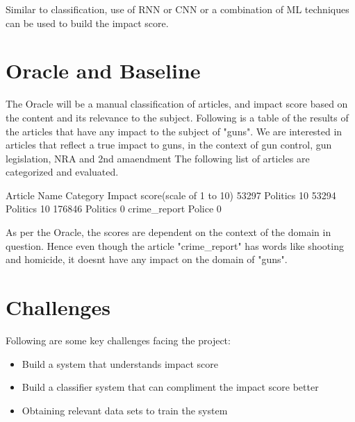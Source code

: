 \documentclass{article}
\begin{document}
Similar to classification, use of RNN or CNN or a combination of ML techniques can be used to build the impact score.

\section*{Oracle and Baseline} %

The Oracle will be a manual classification of articles, and impact score based on the content and its relevance to the subject.
Following is a table of the results of the articles that have any impact to the subject of "guns".
We are interested in articles that reflect a true impact to guns, in the context of gun control, gun legislation, NRA and 2nd amaendment
The following list of articles are categorized and evaluated.

Article Name    Category    Impact score(scale of 1 to 10)
53297           Politics    10
53294           Politics    10
176846          Politics    0
crime_report    Police      0

As per the Oracle, the scores are dependent on the context of the domain in question.
Hence even though the article "crime_report" has words like shooting and homicide, it doesnt have any impact on the domain of "guns".


\section*{Challenges} %

Following are some key challenges facing the project:
\begin{itemize}
	\item Build a system that understands impact score
	\item Build a classifier system that can compliment the impact score better
	\item Obtaining relevant data sets to train the system
\end{itemize}

 
\end{document}
